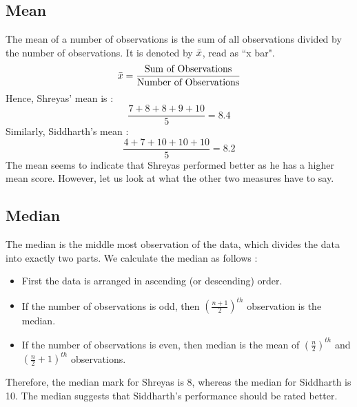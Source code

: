 \documentclass[12pt, letterpaper]{article}
\begin{document}
\subsection{Mean}
The mean of a number of observations is the sum of all observations divided by the number of observations. It is denoted by $\Bar{x}$, read as ``x bar".
\begin{displaymath}
    \Bar{x} = \frac{\text{Sum of Observations}}{\text{Number of Observations}}
\end{displaymath}
Hence, Shreyas' mean is :
\begin{displaymath}
    \frac{7+8+8+9+10}{5} = 8.4
\end{displaymath}
Similarly, Siddharth's mean :
\begin{displaymath}
    \frac{4+7+10+10+10}{5} = 8.2
\end{displaymath}
The mean seems to indicate that Shreyas performed better as he has a higher mean score. However, let us look at what the other two measures have to say.

\subsection{Median}
The median is the middle most observation of the data, which divides the data into exactly two parts. We calculate the median as follows : 
\begin{itemize}
    \item First the data is arranged in ascending (or descending) order.
    \item If the number of observations is odd, then $(\frac{n+1}{2})^{th}$ observation is the median.
    \item If the number of observations is even, then median is the mean of $(\frac{n}{2})^{th}$ and $(\frac{n}{2}+1)^{th}$ observations.
\end{itemize}
 Therefore, the median mark for Shreyas is 8, whereas the median for Siddharth is 10. The median suggests that Siddharth's performance should be rated better.
\end{document}
